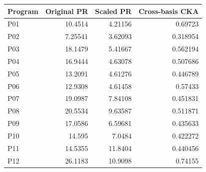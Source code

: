 \begin{center}\small
\begin{tabular}{@{}lrrr@{}}
\toprule
Program & Original PR & Scaled PR & Cross-basis CKA \\
\midrule
P01 & 10.4514 & 4.21156 & 0.69723 \\
P02 & 7.25541 & 3.62093 & 0.318954 \\
P03 & 18.1479 & 5.41667 & 0.562194 \\
P04 & 16.9444 & 4.63078 & 0.507686 \\
P05 & 13.2091 & 4.61276 & 0.446789 \\
P06 & 12.9308 & 4.61458 & 0.57433 \\
P07 & 19.0987 & 7.84108 & 0.451831 \\
P08 & 20.5534 & 9.63587 & 0.511871 \\
P09 & 17.0586 & 6.59681 & 0.435633 \\
P10 & 14.595 & 7.0484 & 0.422272 \\
P11 & 14.5355 & 11.8404 & 0.440456 \\
P12 & 26.1183 & 10.9098 & 0.74155 \\
\bottomrule
\end{tabular}
\end{center}
